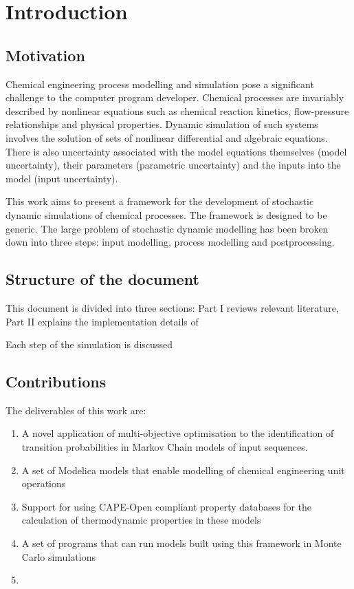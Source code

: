 \chapter{Introduction}\label{chap:intro}

\section{Motivation}
Chemical engineering process modelling and simulation pose a
significant challenge to the computer program developer.  Chemical
processes are invariably described by nonlinear equations such as
chemical reaction kinetics, flow-pressure relationships and physical
properties.  Dynamic simulation of such systems involves the solution of
sets of nonlinear differential and algebraic equations.  There is also
uncertainty associated with the model equations themselves (model
uncertainty), their parameters (parametric uncertainty) and the inputs
into the model (input uncertainty).

This work aims to present a framework for the development of
stochastic dynamic simulations of chemical processes. The framework is
designed to be generic. The large problem of stochastic dynamic
modelling has been broken down into three steps: input modelling,
process modelling and postprocessing.

\section{Structure of the document}
This document is divided into three sections: Part I reviews relevant literature, Part II explains the implementation details of 

Each step of the simulation is
discussed

\section{Contributions}
The deliverables of this work are:
\begin{enumerate}
\item A novel application of multi-objective optimisation to the identification of transition probabilities in Markov Chain models of input sequences.
\item A set of Modelica models that enable modelling of chemical engineering unit operations
\item Support for using CAPE-Open compliant property databases for the calculation of thermodynamic properties in these models
\item A set of programs that can run models built using this framework in Monte Carlo simulations
\item 
\end{enumerate}

